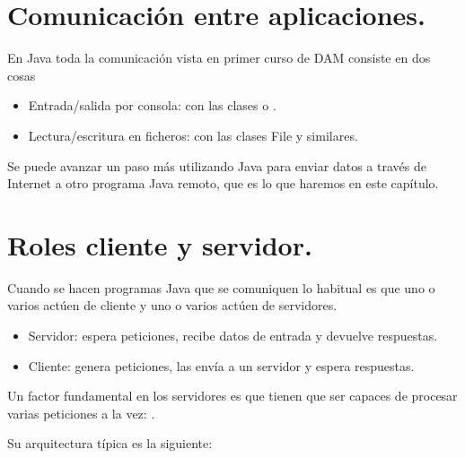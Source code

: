 \documentclass[letterpaper,10pt,spanish]{sphinxmanual}
\begin{document}
\section{Comunicación entre aplicaciones.}
\label{\detokenize{textos/tema3:comunicacion-entre-aplicaciones}}
En Java toda la comunicación vista en primer curso de DAM consiste en dos cosas
\begin{itemize}
\item {} 
Entrada/salida por consola: con las clases  o .

\item {} 
Lectura/escritura en ficheros: con las clases File y similares.

\end{itemize}

Se puede avanzar un paso más utilizando Java para enviar datos a través de Internet a otro programa Java remoto, que es lo que haremos en este capítulo.


\section{Roles cliente y servidor.}
\label{\detokenize{textos/tema3:roles-cliente-y-servidor}}
Cuando se hacen programas Java que se comuniquen lo habitual es que uno o varios actúen de cliente y uno o varios actúen de servidores.
\begin{itemize}
\item {} 
Servidor: espera peticiones, recibe datos de entrada y devuelve respuestas.

\item {} 
Cliente: genera peticiones, las envía a un servidor y espera respuestas.

\end{itemize}

Un factor fundamental en los servidores es que tienen que ser capaces de procesar varias peticiones a la vez: .

Su arquitectura típica es la siguiente:

\begin{sphinxVerbatim}[commandchars=\\\{\}]
 
         
\end{sphinxVerbatim}
\end{document}
